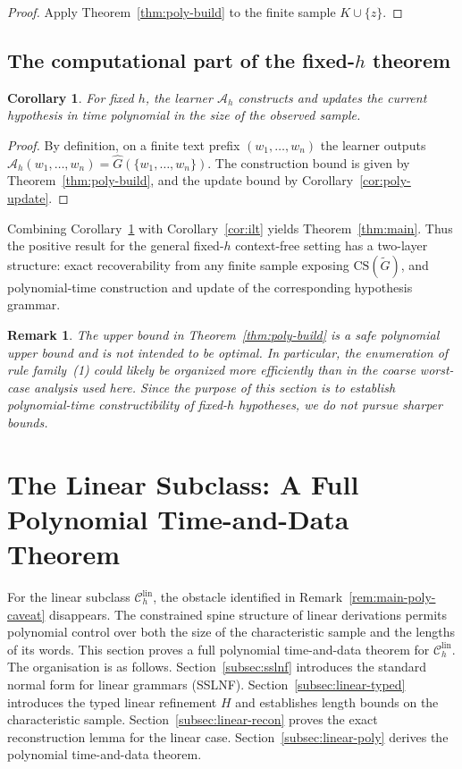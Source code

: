 \documentclass[11pt,a4paper]{article}
\newtheorem{corollary}[theorem]{Corollary}
\newtheorem{remark}[theorem]{Remark}
\newcommand{\CS}{\mathrm{CS}}
\newcommand{\lin}{\mathrm{lin}}
\newcommand{\Clin}[1]{\mathcal C_{#1}^{\lin}}
\begin{document}
\begin{proof}
Apply Theorem~\ref{thm:poly-build} to the finite sample $K\cup\{z\}$.
\end{proof}

\subsection{The computational part of the fixed-\texorpdfstring{$h$}{h} theorem}

\begin{corollary}\label{cor:main-complexity}
For fixed $h$, the learner $\mathcal A_h$ constructs and updates the current hypothesis in time polynomial in the size of the observed sample.
\end{corollary}

\begin{proof}
By definition, on a finite text prefix $(w_1,\dots,w_n)$ the learner outputs $\mathcal A_h(w_1,\dots,w_n)=\hat G(\{w_1,\dots,w_n\})$. The construction bound is given by Theorem~\ref{thm:poly-build}, and the update bound by Corollary~\ref{cor:poly-update}.
\end{proof}

Combining Corollary~\ref{cor:main-complexity} with Corollary~\ref{cor:ilt} yields Theorem~\ref{thm:main}. Thus the positive result for the general fixed-$h$ context-free setting has a two-layer structure: exact recoverability from any finite sample exposing $\CS(\widetilde G)$, and polynomial-time construction and update of the corresponding hypothesis grammar.

\begin{remark}
The upper bound in Theorem~\ref{thm:poly-build} is a safe polynomial upper bound and is not intended to be optimal. In particular, the enumeration of rule family~\textup{(1)} could likely be organized more efficiently than in the coarse worst-case analysis used here. Since the purpose of this section is to establish polynomial-time constructibility of fixed-$h$ hypotheses, we do not pursue sharper bounds.
\end{remark}

\section{The Linear Subclass: A Full Polynomial Time-and-Data Theorem}
\label{sec:linear}

For the linear subclass $\Clin{h}$, the obstacle identified in
Remark~\ref{rem:main-poly-caveat} disappears.
The constrained spine structure of linear derivations permits polynomial control
over both the size of the characteristic sample and the lengths of its words.
This section proves a full polynomial time-and-data theorem for $\Clin{h}$.
The organisation is as follows.
Section~\ref{subsec:sslnf} introduces the standard normal form for linear grammars (SSLNF).
Section~\ref{subsec:linear-typed} introduces the typed linear refinement $H$ and
establishes length bounds on the characteristic sample.
Section~\ref{subsec:linear-recon} proves the exact reconstruction lemma for the linear case.
Section~\ref{subsec:linear-poly} derives the polynomial time-and-data theorem.
\end{document}
